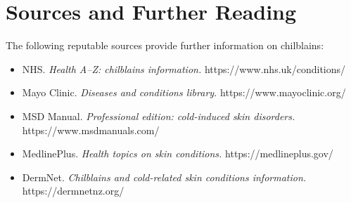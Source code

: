\section*{Sources and Further Reading}
The following reputable sources provide further information on chilblains:
\begin{itemize}
    \item NHS. \textit{Health A--Z: chilblains information.} https://www.nhs.uk/conditions/
    \item Mayo Clinic. \textit{Diseases and conditions library.} https://www.mayoclinic.org/
    \item MSD Manual. \textit{Professional edition: cold-induced skin disorders.} https://www.msdmanuals.com/
    \item MedlinePlus. \textit{Health topics on skin conditions.} https://medlineplus.gov/
    \item DermNet. \textit{Chilblains and cold-related skin conditions information.} https://dermnetnz.org/
\end{itemize}
